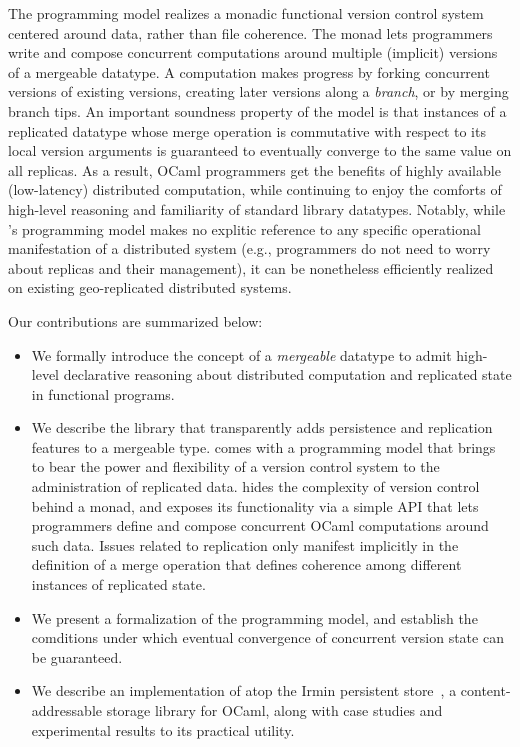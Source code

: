 The \name programming model realizes a monadic functional version
control system centered around data, rather than file coherence.  The
\name monad lets programmers write and compose concurrent computations
around multiple (implicit) versions of a mergeable datatype.  A
computation makes progress by forking concurrent versions of existing
versions, creating later versions along a \emph{branch}, or by merging
branch tips.  An important soundness property of the model is that
instances of a replicated datatype whose merge operation is
commutative with respect to its local version arguments is guaranteed
to eventually converge to the same value on all replicas.  As a
result, OCaml programmers get the benefits of highly available
(low-latency) distributed computation, while continuing to enjoy the
comforts of high-level reasoning and familiarity of standard library
datatypes.  Notably, while \name's programming model makes no explitic
reference to any specific operational manifestation of a distributed
system (e.g., programmers do not need to worry about replicas and
their management), it can be nonetheless efficiently realized on
existing geo-replicated distributed systems.

Our contributions are summarized below:

\begin{itemize}
    \item We formally introduce the concept of a \emph{mergeable} datatype
      to admit high-level declarative reasoning about distributed
      computation and replicated state in functional programs.

    \item We describe the \name library that transparently adds
      persistence and replication features to a mergeable type. \name
      comes with a programming model that brings to bear the power and
      flexibility of a version control system to the administration of
      replicated data. \name hides the complexity of version control
      behind a monad, and exposes its functionality via a simple API
      that lets programmers define and compose concurrent OCaml
      computations around such data.  Issues related to replication
      only manifest implicitly in the definition of a merge operation
      that defines coherence among different instances of replicated
      state.

    \item We present a formalization of the \name programming model,
      and establish the comditions under which eventual convergence of
      concurrent version state can be guaranteed.

    \item We describe an implementation of \name atop the Irmin
      persistent store~\cite{...}, a content-addressable storage
      library for OCaml, along with case studies and experimental
      results to its practical utility.
\end{itemize}



